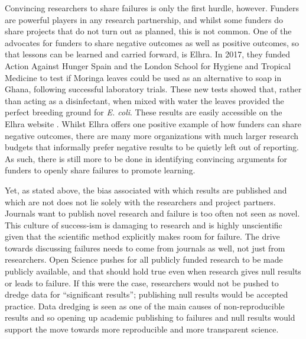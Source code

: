 \documentclass[twocolumn, serif, authordate, editorial]{jote-article}
\begin{document}
Convincing researchers to share failures is only the first hurdle, however. Funders are powerful players in any research partnership, and whilst some funders do share projects that do not turn out as planned, this is not common. One of the advocates for funders to share negative outcomes as well as positive outcomes, so that lessons can be learned and carried forward, is Elhra. In 2017, they funded Action Against Hunger Spain and the London School for Hygiene and Tropical Medicine to test if Moringa leaves could be used as an alternative to soap in Ghana, following successful laboratory trials. These new tests showed that, rather than acting as a disinfectant, when mixed with water the leaves provided the perfect breeding ground for \textit{E. coli}. These results are easily accessible on the Elhra website \parencite{ActionAgainstHungerSpain2018}. Whilst Elhra offers one positive example of how funders can share negative outcomes, there are many more organizations with much larger research budgets that informally prefer negative results to be quietly left out of reporting. As such, there is still more to be done in identifying convincing arguments for funders to openly share failures to promote learning.

Yet, as stated above, the bias associated with which results are published and which are not does not lie solely with the researchers and project partners. Journals want to publish novel research and failure is too often not seen as novel. This culture of success-ism is damaging to research and is highly unscientific given that the scientific method explicitly makes room for failure. The drive towards discussing failures needs to come from journals as well, not just from researchers. Open Science pushes for all publicly funded research to be made publicly available, and that should hold true even when research gives null results or leads to failure. If this were the case, researchers would not be pushed to dredge data for “significant results”; publishing null results would be accepted practice. Data dredging is seen as one of the main causes of non-reproducible results and so opening up academic publishing to failures and null results would support the move towards more reproducible and more transparent science.
\end{document}
